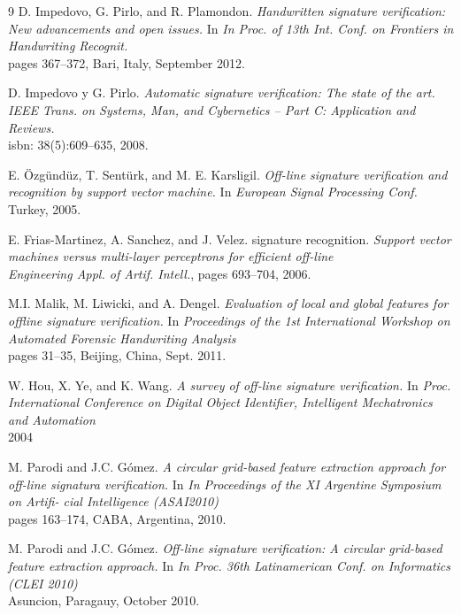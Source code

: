 \begin{thebibliography}{9}
D. Impedovo, G. Pirlo, and R. Plamondon.
\textit{ Handwritten signature verification: New advancements and open issues. } In \textit{In Proc. of 13th Int. Conf. on Frontiers in Handwriting Recognit.} \\
pages 367–372, Bari, Italy, September 2012.

D. Impedovo y G. Pirlo.
\textit{ Automatic signature verification: The state of the art. IEEE Trans. on Systems, Man, and Cybernetics – Part C: Application
and Reviews. } \\
isbn: 38(5):609–635, 2008.

E. Özgündüz, T. Sentürk, and M. E. Karsligil.
\textit{ Off-line signature verification and recognition by support vector machine. } In \textit{European Signal Processing Conf.} \\
Turkey, 2005.

E. Frias-Martinez, A. Sanchez, and J. Velez. signature recognition.
\textit{ Support vector machines versus multi-layer perceptrons for efficient off-line } \\
\textit{Engineering Appl. of Artif. Intell.}, pages 693–704, 2006.


M.I. Malik, M. Liwicki, and A. Dengel.
\textit{ Evaluation of local and global features for offline signature verification. } In \textit{Proceedings of the 1st International Workshop on Automated Forensic Handwriting Analysis} \\
pages 31–35, Beijing, China, Sept. 2011.

W. Hou, X. Ye, and K. Wang.
\textit{ A survey of off-line signature verification. } In \textit{Proc. International Conference on Digital Object Identifier, Intelligent Mechatronics and Automation} \\
2004

M. Parodi and J.C. Gómez.
\textit{ A circular grid-based feature extraction approach for off-line signatura verification. } In \textit{In Proceedings of the XI Argentine Symposium on Artifi-
cial Intelligence (ASAI2010)} \\
pages 163–174, CABA, Argentina, 2010.

M. Parodi and J.C. Gómez.
\textit{ Off-line signature verification: A circular grid-based feature extraction approach. } In \textit{In Proc. 36th Latinamerican Conf. on Informatics (CLEI 2010)} \\
Asuncion, Paragauy, October 2010.


\end{thebibliography}
